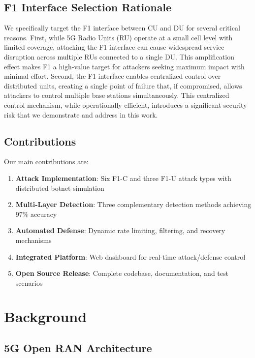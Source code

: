 \documentclass[conference]{IEEEtran}
\begin{document}
\subsection{F1 Interface Selection Rationale}

We specifically target the F1 interface between CU and DU for several critical reasons. First, while 5G Radio Units (RU) operate at a small cell level with limited coverage, attacking the F1 interface can cause widespread service disruption across multiple RUs connected to a single DU. This amplification effect makes F1 a high-value target for attackers seeking maximum impact with minimal effort. Second, the F1 interface enables centralized control over distributed units, creating a single point of failure that, if compromised, allows attackers to control multiple base stations simultaneously. This centralized control mechanism, while operationally efficient, introduces a significant security risk that we demonstrate and address in this work.

\subsection{Contributions}

Our main contributions are:
\begin{enumerate}
    \item \textbf{Attack Implementation}: Six F1-C and three F1-U attack types with distributed botnet simulation
    \item \textbf{Multi-Layer Detection}: Three complementary detection methods achieving 97\% accuracy
    \item \textbf{Automated Defense}: Dynamic rate limiting, filtering, and recovery mechanisms
    \item \textbf{Integrated Platform}: Web dashboard for real-time attack/defense control
    \item \textbf{Open Source Release}: Complete codebase, documentation, and test scenarios
\end{enumerate}

\section{Background}

\subsection{5G Open RAN Architecture}
\end{document}
